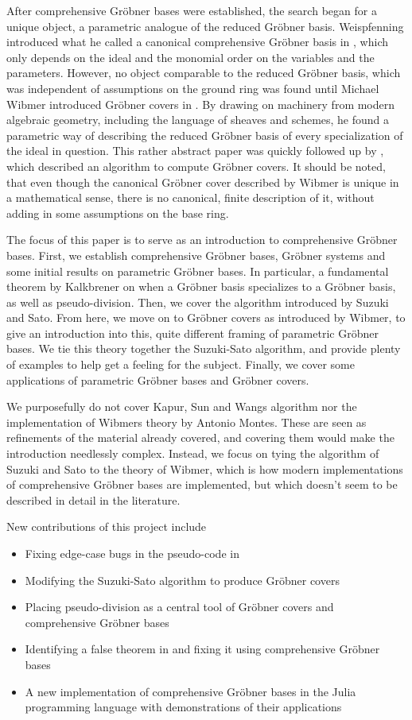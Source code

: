 After comprehensive Gröbner bases were established, the search began for a unique object, a parametric analogue of the reduced Gröbner basis. Weispfenning introduced what he called a canonical comprehensive Gröbner basis in \cite{WEISPFENNING2003669}, which only depends on the ideal and the monomial order on the variables and the parameters. However, no object comparable to the reduced Gröbner basis, which was independent of assumptions on the ground ring was found until Michael Wibmer introduced Gröbner covers in \cite{grb_covers}. By drawing on machinery from modern algebraic geometry, including the language of sheaves and schemes, he found a parametric way of describing the reduced Gröbner basis of every specialization of the ideal in question. This rather abstract paper was quickly followed up by \cite{MONTES20101391}, which described an algorithm to compute Gröbner covers. It should be noted, that even though the canonical Gröbner cover described by Wibmer is unique in a mathematical sense, there is no canonical, finite description of it, without adding in some assumptions on the base ring.

The focus of this paper is to serve as an introduction to comprehensive Gröbner bases. First, we establish comprehensive Gröbner bases, Gröbner systems and some initial results on parametric Gröbner bases. In particular, a fundamental theorem by Kalkbrener\cite{Kalkbrener} on when a Gröbner basis specializes to a Gröbner basis, as well as pseudo-division. Then, we cover the algorithm introduced by Suzuki and Sato. From here, we move on to Gröbner covers as introduced by Wibmer, to give an introduction into this, quite different framing of parametric Gröbner bases. We tie this theory together the Suzuki-Sato algorithm, and provide plenty of examples to help get a feeling for the subject. Finally, we cover some applications of parametric Gröbner bases and Gröbner covers.

We purposefully do not cover Kapur, Sun and Wangs algorithm nor the implementation of Wibmers theory by Antonio Montes\cite{MONTES20101391}. These are seen as refinements of the material already covered, and covering them would make the introduction needlessly complex. Instead, we focus on tying the algorithm of Suzuki and Sato to the theory of Wibmer, which is how modern implementations of comprehensive Gröbner bases are implemented, but which doesn't seem to be described in detail in the literature.

New contributions of this project include
\begin{itemize}
  \item Fixing edge-case bugs in the pseudo-code in \cite{ss_algo}
  \item Modifying the Suzuki-Sato algorithm to produce Gröbner covers
  \item Placing pseudo-division as a central tool of Gröbner covers and comprehensive Gröbner bases
  \item Identifying a false theorem in \cite{sturmfels} and fixing it using comprehensive Gröbner bases
  \item A new implementation of comprehensive Gröbner bases in the Julia programming language with demonstrations of their applications
\end{itemize}
